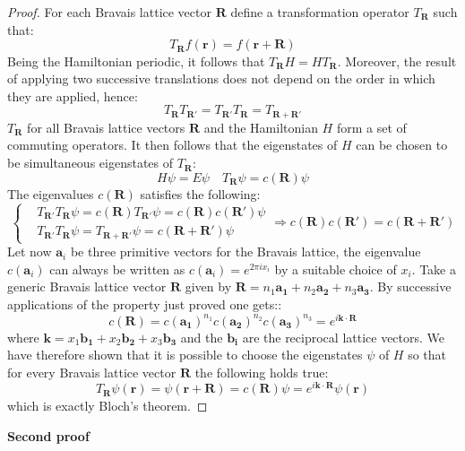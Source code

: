 \documentclass[10.75pt,a4paper,openright,bottom=2cm]{article}
\renewcommand{\Vec}[1]{\boldsymbol{#1}}
\begin{document}
\begin{proof}
For each Bravais lattice vector $\Vec{R}$ define a transformation operator $T_{\Vec{R}}$ such that:
\[
T_{\Vec{R}}f(\Vec{r})=f(\Vec{r}+\Vec{R})
\]
Being the Hamiltonian periodic, it follows that $T_{\Vec{R}}H=HT_{\Vec{R}}$. Moreover, the result of applying two successive translations does not depend on the order in which they are applied, hence:
\[
T_{\Vec{R}}T_{\Vec{R'}}=T_{\Vec{R'}}T_{\Vec{R}}=T_{\Vec{R}+\Vec{R'}}
\]
$T_{\Vec{R}}$ for all Bravais lattice vectors $\Vec{R}$ and the Hamiltonian $H$ form a set of commuting operators. It then follows that the eigenstates of $H$ can be chosen to be simultaneous eigenstates of $T_{\Vec{R}}$:
\[
H\psi=E\psi \quad T_{\Vec{R}}\psi=c(\Vec{R})\psi
\]
The eigenvalues $c(\Vec{R})$ satisfies the following:
\[
\left\{
\begin{aligned}
&T_{\Vec{R}'}T_{\Vec{R}}\psi=c(\Vec{R})T_{\Vec{R}'}\psi=c(\Vec{R})c(\Vec{R}')\psi\\
&T_{\Vec{R}'}T_{\Vec{R}}\psi=T_{\Vec{R}+\Vec{R}'}\psi=c(\Vec{R}+\Vec{R}')\psi
\end{aligned}
\right.
\Rightarrow
c(\Vec{R})c(\Vec{R}')=c(\Vec{R}+\Vec{R}')
\]
Let now $\Vec{a}_i$ be three primitive vectors for the Bravais lattice, the eigenvalue $c(\Vec{a}_i)$ can always be written as $c(\Vec{a}_i)=e^{2\pi ix_i}$ by a suitable choice of $x_i$. Take a generic Bravais lattice vector $\Vec{R}$ given by $\Vec{R}=n_1\Vec{a_1}+n_2\Vec{a_2}+n_3\Vec{a_3}$. By successive applications of the property just proved one gets::
\[
c(\Vec{R})=c(\Vec{a_1})^{n_1}c(\Vec{a_2})^{n_2}c(\Vec{a_3})^{n_3}=e^{i\Vec{k}\cdot\Vec{R}}
\]
where $\Vec{k}=x_1\Vec{b_1}+x_2\Vec{b_2}+x_3\Vec{b_3}$ and the $\Vec{b_i}$ are the reciprocal lattice vectors. We have therefore shown that it is possible to choose the eigenstates $\psi$ of $H$ so that for every Bravais lattice vector $\Vec{R}$ the following holds true:
\[
T_{\Vec{R}}\psi(\Vec{r})=\psi(\Vec{r}+\Vec{R})=c(\Vec{R})\psi=e^{i\Vec{k}\cdot\Vec{R}}\psi(\Vec{r})
\]
which is exactly Bloch's theorem.
\end{proof}
\noindent\textbf{Second proof}
\end{document}

